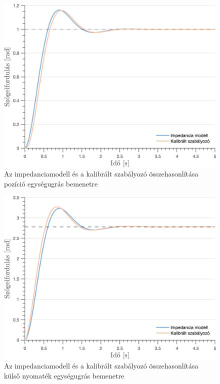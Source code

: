 \begin{figure}[!htb]
    \begin{center}
    \includegraphics[width=13cm]{images/observer_controller_pos_resp_direct_comp_calib.png}
    \caption{Az impedanciamodell és a kalibrált szabályozó összehasonlítása pozíció egységugrás bemenetre}\label{fig:observer_controller_pos_resp_direct_calib}
    \end{center}
\end{figure}
\begin{figure}[H]
    \begin{center}
    \includegraphics[width=13cm]{images/observer_controller_torque_resp_direct_comp_calib.png}
    \caption{Az impedanciamodell és a kalibrált szabályozó összehasonlítása külső nyomaték egységugrás bemenetre}\label{fig:observer_controller_torque_resp_direct_calib}
    \end{center}
\end{figure}

